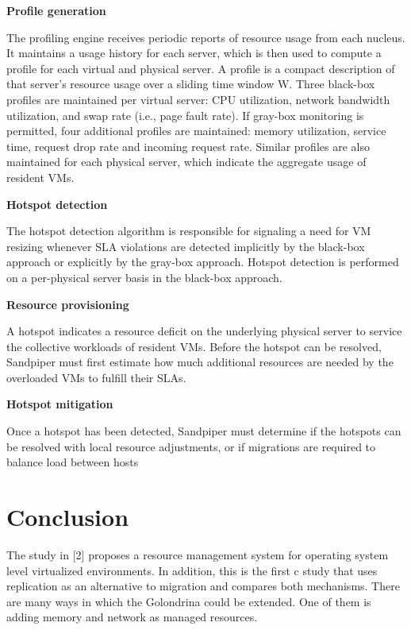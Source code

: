 \documentclass[12pt]{article} %
\begin{document}
\textbf{Profile generation} 



The profiling engine receives periodic reports of resource
usage from each nucleus. It maintains a usage history
for each server, which is then used to compute a
profile for each virtual and physical server. A profile is a
compact description of that server’s resource usage over
a sliding time window W. Three black-box profiles are
maintained per virtual server: CPU utilization, network
bandwidth utilization, and swap rate (i.e., page fault rate).
If gray-box monitoring is permitted, four additional profiles
are maintained: memory utilization, service time, request
drop rate and incoming request rate. Similar
profiles are also maintained for each physical server, which
indicate the aggregate usage of resident VMs.


\textbf{Hotspot detection}




The hotspot detection algorithm is responsible for signaling
a need for VM resizing whenever SLA violations
are detected implicitly by the black-box approach or
explicitly by the gray-box approach. Hotspot detection is
performed on a per-physical server basis in the black-box
approach.



\textbf{Resource provisioning}



A hotspot indicates a resource deficit on the underlying
physical server to service the collective workloads of resident
VMs. Before the hotspot can be resolved, Sandpiper must first estimate how much additional resources are
needed by the overloaded VMs to fulfill their SLAs.




\textbf{Hotspot mitigation}



Once a hotspot has been detected, Sandpiper must
determine if the hotspots can be resolved with local resource
adjustments, or if migrations are required to balance
load between hosts 



\section{Conclusion}
The study in [2] proposes a resource management system for operating system level virtualized environments. In addition, this is the first c study that uses replication as an alternative to migration
and compares both mechanisms.
There are many ways in which the Golondrina could be extended. One of them is adding memory and network as managed resources. 
\end{document}
